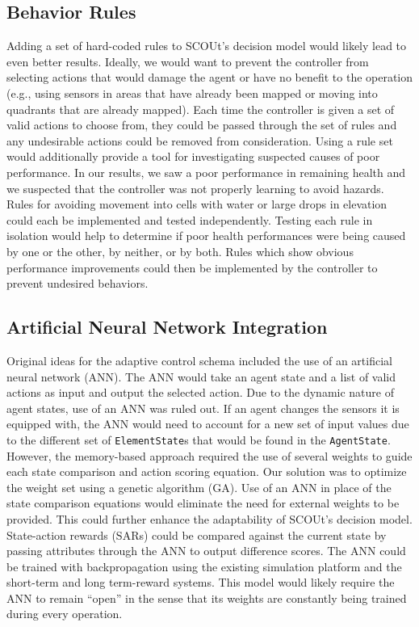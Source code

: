 \subsection{Behavior Rules}
Adding a set of hard-coded rules to SCOUt's decision model would likely lead to even better results.
Ideally, we would want to prevent the controller from selecting actions that would damage the agent or have no benefit to the operation (e.g., using sensors in areas that have already been mapped or moving into quadrants that are already mapped).
Each time the controller is given a set of valid actions to choose from, they could be passed through the set of rules and any undesirable actions could be removed from consideration.
Using a rule set would additionally provide a tool for investigating suspected causes of poor performance.
In our results, we saw a poor performance in remaining health and we suspected that the controller was not properly learning to avoid hazards.
Rules for avoiding movement into cells with water or large drops in elevation could each be implemented and tested independently.
Testing each rule in isolation would help to determine if poor health performances were being caused by one or the other, by neither, or by both.
Rules which show obvious performance improvements could then be implemented by the controller to prevent undesired behaviors.

\subsection{Artificial Neural Network Integration}
Original ideas for the adaptive control schema included the use of an artificial neural network (ANN).
The ANN would take an agent state and a list of valid actions as input and output the selected action.
Due to the dynamic nature of agent states, use of an ANN was ruled out.
If an agent changes the sensors it is equipped with, the ANN would need to account for a new set of input values due to the different set of \texttt{ElementState}s that would be found in the \texttt{AgentState}.
However, the memory-based approach required the use of several weights to guide each state comparison and action scoring equation.
Our solution was to optimize the weight set using a genetic algorithm (GA).
Use of an ANN in place of the state comparison equations would eliminate the need for external weights to be provided.
This could further enhance the adaptability of SCOUt's decision model.
State-action rewards (SARs) could be compared against the current state by passing attributes through the ANN to output difference scores.
The ANN could be trained with backpropagation using the existing simulation platform and the short-term and long term-reward systems.
This model would likely require the ANN to remain ``open'' in the sense that its weights are constantly being trained during every operation.

